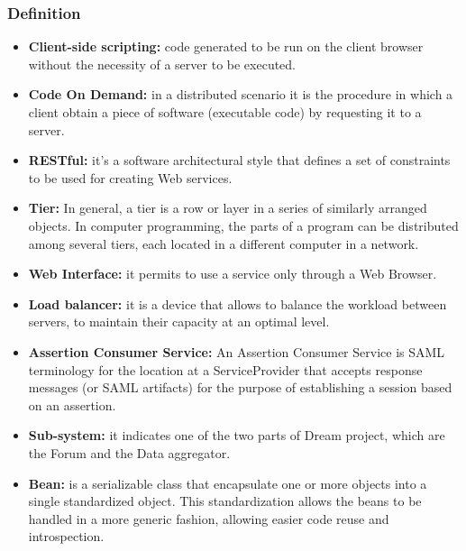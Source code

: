 \subsubsection{Definition}
\begin{itemize}
    \item \textbf{Client-side scripting:} code generated to be run on the client browser without the necessity of a server to be executed.
    \item \textbf{Code On Demand:} in a distributed scenario it is the procedure in which a client obtain a piece of software (executable code) by requesting it to a server.
    \item \textbf{RESTful:} it's a software architectural style that defines a set of constraints to be used for creating Web services.
    \item \textbf{Tier:} In general, a tier is a row or layer in a series of similarly arranged objects. In computer programming, the parts of a program can be distributed among several tiers, each located in a different computer in a network.
    \item \textbf{Web Interface:} it permits to use a service only through a Web Browser.
    \item \textbf{Load balancer:} it is a device that allows to balance the workload between servers, to maintain their capacity at an optimal level. 
    \item \textbf{Assertion Consumer Service:} An Assertion Consumer Service is SAML terminology for the location at a ServiceProvider that accepts response messages (or SAML artifacts) for the purpose of establishing a session based on an assertion.
    \item \textbf{Sub-system:} it indicates one of the two parts of Dream project, which are the Forum and the Data aggregator.
    \item \textbf{Bean:} is a serializable class that encapsulate one or more objects into a single standardized object. This standardization allows the beans to be handled in a more generic fashion, allowing easier code reuse and introspection.
    
\end{itemize}
